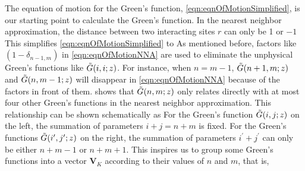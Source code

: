 The equation of motion for the Green's function, \autoref{eqn:eqnOfMotionSimplified}, is our starting point to calculate
the Green's function. In the nearest neighbor approximation, the distance between two interacting sites $r$ can only 
be 1 or $-1$ This simplifies \autoref{eqn:eqnOfMotionSimplified} to 
As mentioned before, factors like $(1- \delta_{n-1, m})$ in \autoref{eqn:eqnOfMotionNNA} are used to eliminate 
the unphysical Green's functions like $\Tilde{G}(i, i; z)$. For instance, when $n = m - 1$, $\Tilde{G}(n+1, m; z)$ and 
$\Tilde{G}(n, m-1; z)$ will disappear in \autoref{eqn:eqnOfMotionNNA} because of the factors in front of them. 
 shows that $\Tilde{G}(n, m; z)$ only relates directly with at most four other Green's
functions in the nearest neighbor approximation. This relationship can be shown schematically as 
For the Green's function $\Tilde{G}(i, j; z)$ on the left, the summation of parameters $i + j = n + m$ is fixed. For the 
Green's functions $\Tilde{G}(i^{\prime}, j^{\prime}; z)$ on the right, the summation of parameters
 $i^{\prime} + j^{\prime}$ can only be either $n+m-1$ or $n+m+1$. 
This inspires us to group some Green's functions into a vector $\mathbf{V}_{K}$ according to their values of $n$ and $m$, that is,
